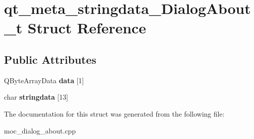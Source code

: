 \hypertarget{structqt__meta__stringdata__DialogAbout__t}{\section{qt\-\_\-meta\-\_\-stringdata\-\_\-\-Dialog\-About\-\_\-t Struct Reference}
\label{structqt__meta__stringdata__DialogAbout__t}
}
\subsection*{Public Attributes}
\begin{DoxyCompactItemize}
\item 
\hypertarget{structqt__meta__stringdata__DialogAbout__t_a7f58848b434d238a59cebe3f3c1686a9}{Q\-Byte\-Array\-Data {\bfseries data} \mbox{[}1\mbox{]}}\label{structqt__meta__stringdata__DialogAbout__t_a7f58848b434d238a59cebe3f3c1686a9}

\item 
\hypertarget{structqt__meta__stringdata__DialogAbout__t_a8ea547617fc57ff7255e95790b797eb9}{char {\bfseries stringdata} \mbox{[}13\mbox{]}}\label{structqt__meta__stringdata__DialogAbout__t_a8ea547617fc57ff7255e95790b797eb9}

\end{DoxyCompactItemize}


The documentation for this struct was generated from the following file\-:\begin{DoxyCompactItemize}
\item 
moc\-\_\-dialog\-\_\-about.\-cpp\end{DoxyCompactItemize}
